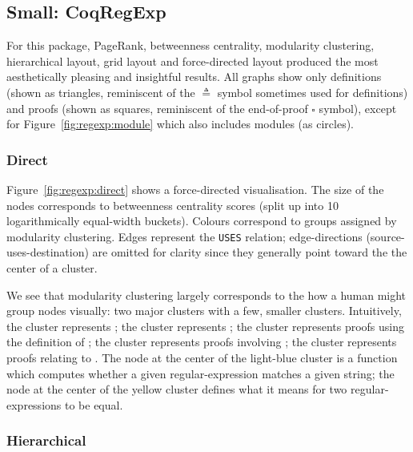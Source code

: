 \subsection{Small: CoqRegExp}

For this package, PageRank, betweenness centrality, modularity clustering,
hierarchical layout, grid layout and force-directed layout produced the most
aesthetically pleasing and insightful results. All graphs show only definitions
(shown as triangles, reminiscent of the $\triangleq$ symbol sometimes used for
definitions) and proofs (shown as squares, reminiscent of the end-of-proof
$\square$ symbol), except for Figure~\ref{fig:regexp:module} which also includes
modules (as circles).

\subsubsection{Direct}

Figure~\ref{fig:regexp:direct} shows a force-directed visualisation. The size of
the nodes corresponds to betweenness centrality scores (split up into 10
logarithmically equal-width buckets). Colours correspond to groups assigned by modularity
clustering. Edges represent the \texttt{USES} relation; edge-directions
(source-uses-destination) are omitted for clarity since they generally point
toward the the center of a cluster.

We see that modularity clustering largely corresponds to the how a human might
group nodes visually: two major clusters with a few, smaller clusters.
Intuitively, the  cluster represents ; the  cluster represents ; the  cluster represents proofs using the
definition of ; the  cluster
represents proofs involving ;
the  cluster represents proofs relating to . The node at the center of the light-blue cluster is a function which
computes whether a given regular-expression matches a given string; the node at
the center of the yellow cluster defines what it means for two
regular-expressions to be equal.

\subsubsection{Hierarchical}

